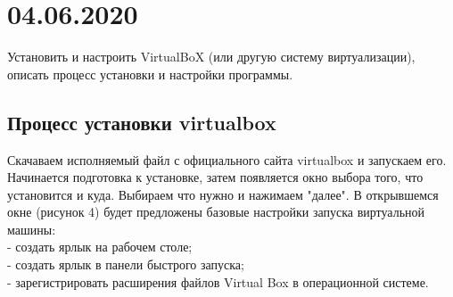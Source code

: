 \documentclass[a4paper,14pt]{extarticle}
\begin{document}
\section{04.06.2020}
Установить и настроить VirtualBoX (или другую систему виртуализации), описать процесс установки и настройки программы.
\subsection{Процесс установки virtualbox}
Скачаваем исполняемый файл с официального сайта virtualbox\cite{virtualbox} и запускаем его. Начинается подготовка к установке, затем появляется окно выбора того, что установится и куда. Выбираем что нужно и нажимаем "далее". В открывшемся окне (рисунок 4) будет предложены базовые настройки запуска виртуальной машины:\\
- создать ярлык на рабочем столе;\\
- создать ярлык в панели быстрого запуска;\\
- зарегистрировать расширения файлов Virtual Box в операционной системе.\\
\end{document}
